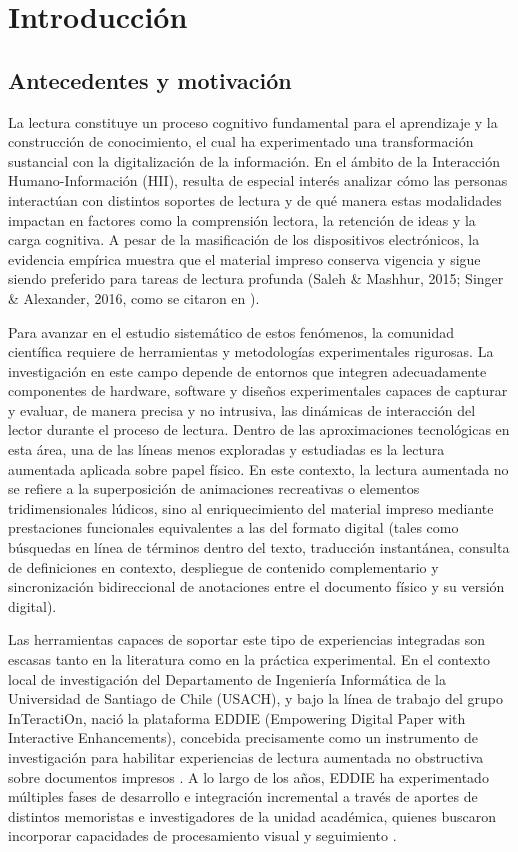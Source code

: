 \chapter{Introducci\'on}
\label{cap:introduccion}

\section{Antecedentes y motivaci\'on}
\label{intro:motivacion}
La lectura constituye un proceso cognitivo fundamental para el aprendizaje y la construcción de conocimiento, el cual ha experimentado una transformación sustancial con la digitalización de la información. En el ámbito de la Interacción Humano-Información (HII), resulta de especial interés analizar cómo las personas interactúan con distintos soportes de lectura y de qué manera estas modalidades impactan en factores como la comprensión lectora, la retención de ideas y la carga cognitiva. A pesar de la masificación de los dispositivos electrónicos, la evidencia empírica muestra que el material impreso conserva vigencia y sigue siendo preferido para tareas de lectura profunda (Saleh \& Mashhur, 2015; Singer \& Alexander, 2016, como se citaron en \citealp{santibanez2020rediseno}).


Para avanzar en el estudio sistemático de estos fenómenos, la comunidad científica requiere de herramientas y metodologías experimentales rigurosas. La investigación en este campo depende de entornos que integren adecuadamente componentes de hardware, software y diseños experimentales capaces de capturar y evaluar, de manera precisa y no intrusiva, las dinámicas de interacción del lector durante el proceso de lectura. Dentro de las aproximaciones tecnológicas en esta área, una de las líneas menos exploradas y estudiadas es la lectura aumentada aplicada sobre papel físico. En este contexto, la lectura aumentada no se refiere a la superposición de animaciones recreativas o elementos tridimensionales lúdicos, sino al enriquecimiento del material impreso mediante prestaciones funcionales equivalentes a las del formato digital (tales como búsquedas en línea de términos dentro del texto, traducción instantánea, consulta de definiciones en contexto, despliegue de contenido complementario y sincronización bidireccional de anotaciones entre el documento físico y su versión digital).


Las herramientas capaces de soportar este tipo de experiencias integradas son escasas tanto en la literatura como en la práctica experimental. En el contexto local de investigación del Departamento de Ingeniería Informática de la Universidad de Santiago de Chile (USACH), y bajo la línea de trabajo del grupo InTeractiOn, nació la plataforma EDDIE (Empowering Digital Paper with Interactive Enhancements), concebida precisamente como un instrumento de investigación para habilitar experiencias de lectura aumentada no obstructiva sobre documentos impresos \citep{carrasco2017diseno}. A lo largo de los años, EDDIE ha experimentado múltiples fases de desarrollo e integración incremental a través de aportes de distintos memoristas e investigadores de la unidad académica, quienes buscaron incorporar capacidades de procesamiento visual y seguimiento \citep{ibaceta2023evaluacion}.


